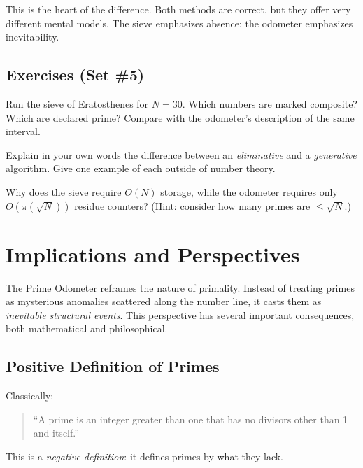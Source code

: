\documentclass[11pt]{article}
\theoremstyle{definition}
\begin{document}
This is the heart of the difference. 
Both methods are correct, but they offer very different mental models. 
The sieve emphasizes absence; the odometer emphasizes inevitability.

\subsection*{Exercises (Set \#5)}

\begin{studentexercise}
Run the sieve of Eratosthenes for $N=30$.  
Which numbers are marked composite? Which are declared prime?  
Compare with the odometer’s description of the same interval.
\end{studentexercise}

\begin{studentexercise}
Explain in your own words the difference between an \emph{eliminative} 
and a \emph{generative} algorithm.  
Give one example of each outside of number theory.
\end{studentexercise}

\begin{studentexercise}
Why does the sieve require $O(N)$ storage, 
while the odometer requires only $O(\pi(\sqrt{N}))$ residue counters?  
(Hint: consider how many primes are $\leq \sqrt{N}$.)
\end{studentexercise}

\section{Implications and Perspectives}

The Prime Odometer reframes the nature of primality.  
Instead of treating primes as mysterious anomalies scattered along the number line, 
it casts them as \emph{inevitable structural events}.  
This perspective has several important consequences, both mathematical and philosophical.

\subsection{Positive Definition of Primes}

Classically:
\begin{quote}
``A prime is an integer greater than one that has no divisors other than 1 and itself.''
\end{quote}

This is a \emph{negative definition}: it defines primes by what they lack.  
\end{document}
